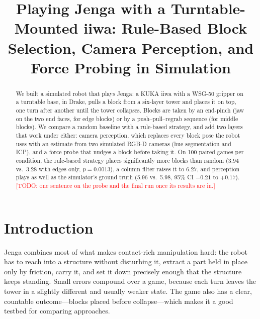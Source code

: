 \documentclass[conference]{IEEEtran}
\newcommand{\todo}[1]{\textcolor{red}{[TODO: #1]}}
\begin{document}
\title{Playing Jenga with a Turntable-Mounted iiwa: Rule-Based Block Selection, Camera Perception, and Force Probing in Simulation}

\author{
\and
{}
\and
{}
}

\maketitle

\begin{abstract}
We built a simulated robot that plays Jenga: a KUKA iiwa with a WSG-50 gripper on a turntable base, in Drake, pulls a
block from a six-layer tower and places it on top, one turn after another until the tower collapses. Blocks are taken
by an end-pinch (jaw on the two end faces, for edge blocks) or by a push--pull--regrab sequence (for middle blocks).
We compare a random baseline with a rule-based strategy, and add two layers that work under either: camera perception,
which replaces every block pose the robot uses with an estimate from two simulated RGB-D cameras (hue segmentation and
ICP), and a force probe that nudges a block before taking it. On 100 paired games per condition, the rule-based
strategy places significantly more blocks than random (3.94 vs.\ 3.28 with edges only, $p=0.0013$), a column filter
raises it to 6.27, and perception plays as well as the simulator's ground truth (5.96 vs.\ 5.98, 95\% CI
$-0.21$ to $+0.17$). \todo{one sentence on the probe and the final run once its results are in.}
\end{abstract}

\section{Introduction}
Jenga combines most of what makes contact-rich manipulation hard: the robot has to reach into a structure without
disturbing it, extract a part held in place only by friction, carry it, and set it down precisely enough that the
structure keeps standing. Small errors compound over a game, because each turn leaves the tower in a slightly different
and usually weaker state. The game also has a clear, countable outcome---blocks placed before collapse---which makes it
a good testbed for comparing approaches.
\end{document}
